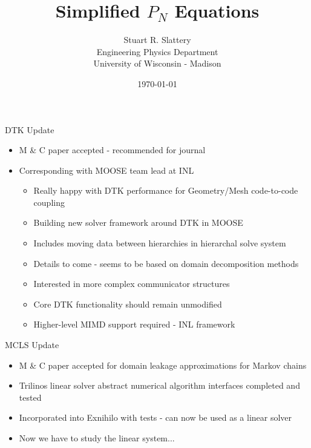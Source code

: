 \documentclass{beamer}
\author{Stuart R. Slattery
  \\ Engineering Physics Department
  \\ University of Wisconsin - Madison
}
\date{\today}
\title{Simplified $P_N$ Equations}
\begin{document}
\maketitle

\begin{frame}{DTK Update}
  \begin{itemize}
  \item M \& C paper accepted - recommended for journal
  \item Corresponding with MOOSE team lead at INL
    \begin{itemize}
    \item Really happy with DTK performance for Geometry/Mesh
      code-to-code coupling
    \item Building new solver framework around DTK in MOOSE
    \item Includes moving data between hierarchies in hierarchal
      solve system
    \item Details to come - seems to be based on domain
      decomposition methods
    \item Interested in more complex communicator structures
    \item Core DTK functionality should remain unmodified
    \item Higher-level MIMD support required - INL framework
    \end{itemize}
  \end{itemize}
\end{frame}

\begin{frame}{MCLS Update}
  \begin{itemize}
  \item M \& C paper accepted for domain leakage approximations for
    Markov chains
  \item Trilinos linear solver abstract numerical algorithm interfaces
    completed and tested
  \item Incorporated into Exnihilo with tests - can now be used as a
    linear solver
  \item Now we have to study the linear system...
  \end{itemize}
\end{frame}
\end{document}
